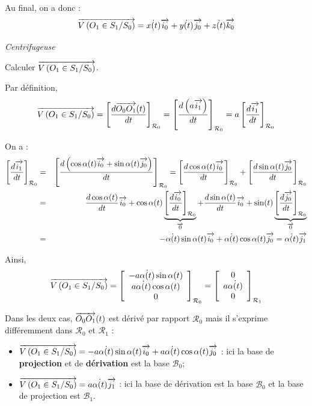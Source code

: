 \documentclass[10pt,oneside]{article}
\begin{document}
Au final, on a donc :
$$\overrightarrow{V\left( {O_1} \in {S_1}/{S_0}\right)} = \dot{x(t)} \overrightarrow{i_0}+\dot{y(t)} \overrightarrow{j_0}+\dot{z(t)} \overrightarrow{k_0} $$







\begin{exemple}
\textit{Centrifugeuse}

Calculer $\overrightarrow{V\left( {O_1} \in {S_1}/{S_0}\right)}$.

Par définition, 
$$
\overrightarrow{V\left( {O_1} \in {S_1}/{S_0}\right)} 
= \left[\dfrac{d\overrightarrow{O_0O_1}(t)}{dt}\right]_{\mathcal{R}_0}
= \left[\dfrac{d \left(a \overrightarrow{i_1}\right) }{dt}\right]_{\mathcal{R}_0}
= a \left[\dfrac{d  \overrightarrow{i_1} }{dt}\right]_{\mathcal{R}_0}
$$

On a :
\begin{eqnarray*}
\left[\dfrac{d  \overrightarrow{i_1} }{dt}\right]_{\mathcal{R}_0}
&=&\left[\dfrac{d \left(\cos\alpha(t)\overrightarrow{i_0}+\sin\alpha(t)\overrightarrow{j_0} \right)}{dt}\right]_{\mathcal{R}_0}
=\left[\dfrac{d  \cos\alpha(t)\overrightarrow{i_0}}{dt}\right]_{\mathcal{R}_0}
+\left[\dfrac{d  \sin\alpha(t)\overrightarrow{j_0} }{dt}\right]_{\mathcal{R}_0}\\
& = & 
\dfrac{d \cos\alpha(t)}{dt} \overrightarrow{i_0}  
+\cos\alpha(t)\underbrace{\left[\dfrac{d  \overrightarrow{i_0}}{dt}\right]_{\mathcal{R}_0}}_{\overrightarrow{0}}
+\dfrac{d \sin\alpha(t)}{dt} \overrightarrow{i_0}  
+\sin(t)\underbrace{\left[\dfrac{d  \overrightarrow{j_0}}{dt}\right]_{\mathcal{R}_0}}_{\overrightarrow{0}}\\
& = & -\dot{\alpha(t)}\sin\alpha(t) \overrightarrow{i_0}   + \dot{\alpha(t)}\cos\alpha(t) \overrightarrow{j_0}  = 
\dot{\alpha(t)}\overrightarrow{j_1}
\end{eqnarray*}

Ainsi,
$$
\overrightarrow{V\left( {O_1} \in {S_1}/{S_0}\right)} 
= \left[\begin{array}{c} 
-a\dot{\alpha(t)}\sin\alpha(t) \\
a \dot{\alpha(t)}\cos\alpha(t) \\
0 \end{array}\right]_{\mathcal{R}_0}
=\left[\begin{array}{c} 0 \\ a\dot{\alpha(t)} \\ 0\end{array}\right]_{\mathcal{R}_1}
$$

Dans les deux cas, $\overrightarrow{O_0O_1}(t)$ est dérivé par rapport $\mathcal{R}_0$ mais il s'exprime différemment dans $\mathcal{R}_0$ et $\mathcal{R}_1$ :
\begin{itemize}
\item $\overrightarrow{V\left( {O_1} \in {S_1}/{S_0}\right)} = -a\dot{\alpha(t)}\sin\alpha(t) \overrightarrow{i_0}   + a\dot{\alpha(t)}\cos\alpha(t) \overrightarrow{j_0}$ : ici la base de \textbf{projection} et de \textbf{dérivation} est la base $\mathcal{B}_0$;
\item $\overrightarrow{V\left( {O_1} \in {S_1}/{S_0}\right)} = a\dot{\alpha(t)}\overrightarrow{j_1}$ : ici la base de dérivation est la base $\mathcal{B}_0$ et la base de projection est $\mathcal{B}_1$.
\end{itemize}


\end{exemple}
\end{document}
